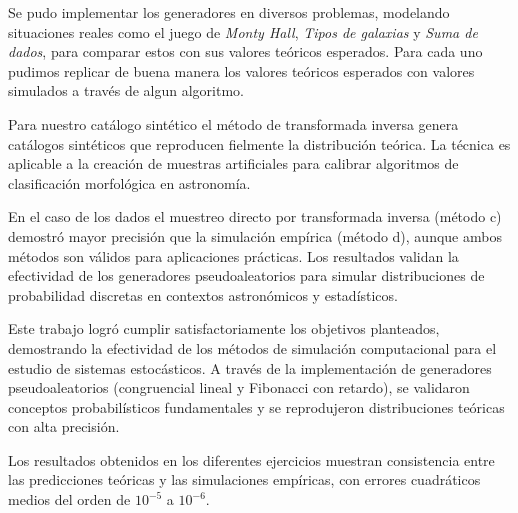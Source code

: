 \documentclass[baaa]{baaa}
\begin{document}
Se pudo implementar los generadores en diversos problemas, modelando situaciones reales como el juego de \textit{Monty Hall}, \textit{Tipos de galaxias} y \textit{Suma de dados}, para comparar estos con sus valores teóricos esperados. Para cada uno pudimos replicar de buena manera los valores teóricos esperados con valores simulados a través de algun algoritmo.

Para nuestro catálogo sintético el método de transformada inversa genera catálogos sintéticos que reproducen fielmente la distribución teórica. La técnica es aplicable a la creación de muestras artificiales para calibrar algoritmos de clasificación morfológica en astronomía.

En el caso de los dados el muestreo directo por transformada inversa (método c) demostró mayor precisión que la simulación empírica (método d), aunque ambos métodos son válidos para aplicaciones prácticas. Los resultados validan la efectividad de los generadores pseudoaleatorios para simular distribuciones de probabilidad discretas en contextos astronómicos y estadísticos.

Este trabajo logró cumplir satisfactoriamente los objetivos planteados, demostrando la efectividad de los métodos de simulación computacional para el estudio de sistemas estocásticos. A través de la implementación de generadores pseudoaleatorios (congruencial lineal y Fibonacci con retardo), se validaron conceptos probabilísticos fundamentales y se reprodujeron distribuciones teóricas con alta precisión.

Los resultados obtenidos en los diferentes ejercicios muestran consistencia entre las predicciones teóricas y las simulaciones empíricas, con errores cuadráticos medios del orden de $10^{-5}$ a $10^{-6}$. 




\small


\end{document}
